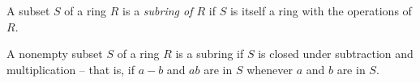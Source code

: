 
\begin{definition}[Subring]
	A subset $S$ of a ring $R$ is a \textit{subring of $R$} if $S$ is itself a ring with the operations of $R$.
\end{definition}

\begin{theorem}
	A nonempty subset $S$ of a ring $R$ is a subring if $S$ is closed under subtraction and multiplication -- that is, if $a - b$ and $ab$ are in $S$ whenever $a$ and $b$ are in $S$.
\end{theorem}
